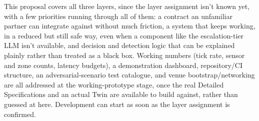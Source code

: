 \documentclass[10pt,letterpaper]{article}
\begin{document}
This proposal covers all three layers, since the layer assignment isn't known yet, with a few priorities running through all of them: a contract an unfamiliar partner can integrate against without much friction, a system that keeps working, in a reduced but still safe way, even when a component like the escalation-tier LLM isn't available, and decision and detection logic that can be explained plainly rather than treated as a black box. Working numbers (tick rate, sensor and zone counts, latency budgets), a demonstration dashboard, repository/CI structure, an adversarial-scenario test catalogue, and venue bootstrap/networking are all addressed at the working-prototype stage, once the real Detailed Specifications and an actual Twin are available to build against, rather than guessed at here. Development can start as soon as the layer assignment is confirmed.
\end{document}
